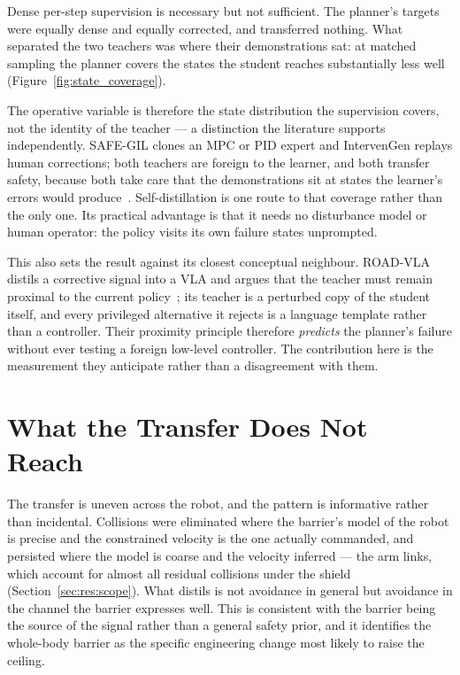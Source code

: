 \documentclass[a4paper,11pt]{report}
\begin{document}
Dense per-step supervision is necessary but not sufficient. The planner's targets were equally
dense and equally corrected, and transferred nothing. What separated the two teachers was where
their demonstrations sat: at matched sampling the planner covers the states the student reaches
substantially less well (Figure~\ref{fig:state_coverage}).

The operative variable is therefore the state distribution the supervision covers, not the identity
of the teacher --- a distinction the literature supports independently. SAFE-GIL clones an MPC or
PID expert and IntervenGen replays human corrections; both teachers are foreign to the learner, and
both transfer safety, because both take care that the demonstrations sit at states the learner's
errors would produce~\cite{ciftci2025safegil,hoque2024intervengen}. Self-distillation is one route
to that coverage rather than the only one. Its practical advantage is that it needs no disturbance
model or human operator: the policy visits its own failure states unprompted.

This also sets the result against its closest conceptual neighbour. ROAD-VLA distils a corrective
signal into a VLA and argues that the teacher must remain proximal to the current
policy~\cite{wang2026roadvla}; its teacher is a perturbed copy of the student itself, and every
privileged alternative it rejects is a language template rather than a controller. Their proximity
principle therefore \emph{predicts} the planner's failure without ever testing a foreign low-level
controller. The contribution here is the measurement they anticipate rather than a disagreement
with them.

\section{What the Transfer Does Not Reach}\label{sec:disc:limits}

The transfer is uneven across the robot, and the pattern is informative rather than incidental.
Collisions were eliminated where the barrier's model of the robot is precise and the constrained
velocity is the one actually commanded, and persisted where the model is coarse and the velocity
inferred --- the arm links, which account for almost all residual collisions under the shield
(Section~\ref{sec:res:scope}). What distils is not avoidance in general but avoidance in the
channel the barrier expresses well. This is consistent with the barrier being the source of the
signal rather than a general safety prior, and it identifies the whole-body barrier as the specific
engineering change most likely to raise the ceiling.
\end{document}
